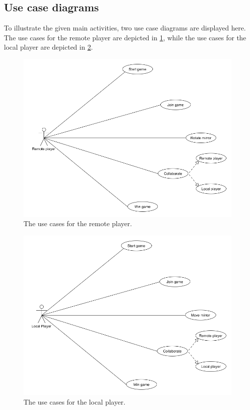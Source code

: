 		\subsection{Use case diagrams} \label{ssec:usecasediagrams}
			To illustrate the given main activities, two use case diagrams are
			displayed here. The use cases for the remote player are depicted in
			\ref{fig:remoteusecase}, while the use cases for the local player
			are depicted in \ref{fig:localusecase}.
			\begin{figure}[!ht]
				\centering
				\includegraphics[scale = 0.4]{RemotePlayerUseCase}
				\caption{The use cases for the remote player.}
				\label{fig:remoteusecase}
			\end{figure}
			\begin{figure}[!ht]
				\centering
				\includegraphics[scale = 0.4]{LocalPlayerUseCase}
				\caption{The use cases for the local player.}
				\label{fig:localusecase}
			\end{figure}

